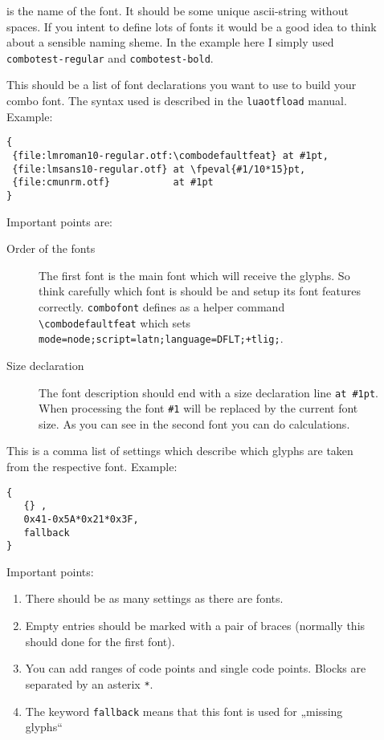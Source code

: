 \documentclass[parskip=half-]{scrartcl}
\newcommand\package[1]{\texttt{#1}}
\begin{document}
\begin{description}
  \item[] is the name of the font. It should be some unique ascii-string without spaces. If you intent to define lots of fonts it would be a good idea to think about a sensible naming sheme. In the example here I simply used \texttt{combotest-regular} and \texttt{combotest-bold}.
      
  \item[] This should be a list of font declarations you want to use to build your combo font. The syntax used is described in the \package{luaotfload} manual. Example:
      
\begin{verbatim}
{
 {file:lmroman10-regular.otf:\combodefaultfeat} at #1pt,
 {file:lmsans10-regular.otf} at \fpeval{#1/10*15}pt,
 {file:cmunrm.otf}           at #1pt
}
\end{verbatim}

Important points are:
\begin{description}
\item[Order of the fonts] The first font is the main font which will receive the glyphs. So think carefully which font is should be and setup its font features correctly. \package{combofont} defines as a helper command \verb+\combodefaultfeat+ which sets \texttt{mode=node;script=latn;language=DFLT;+tlig;}. 
    
\item[Size declaration] The font description should end with a size declaration line \verb+at #1pt+. When processing the font \verb+#1+ will be replaced by the current font size. As you can see in the second font you can do calculations.
\end{description}

\item[] This is a comma list of settings which describe which glyphs are taken from the respective font. Example:

\begin{verbatim}
{
   {} ,
   0x41-0x5A*0x21*0x3F,
   fallback
}
\end{verbatim}

Important points:
\begin{enumerate}
\item There should be as many settings as there are fonts.
\item Empty entries should be marked with a pair of braces (normally this should done for the first font).
\item You can add ranges of code points and single code points. Blocks are separated by an asterix \verb+*+. 
\item The keyword \texttt{fallback} means that this font is used for „missing glyphs“  
\end{enumerate}  
\end{description}
\end{document}
